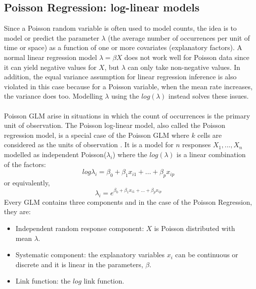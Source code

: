 \subsection{Poisson Regression: log-linear models}
Since a Poisson random variable is often used to model counts, the idea is to model or predict the parameter $\lambda$ (the average number of occurrences per unit of time or space) as a function of one or more covariates (explanatory factors). A normal linear regression model $\lambda = \beta X$ does not work well for Poisson data since it can yield negative values for $X$, but $\lambda$ can only take non-negative values. In addition, the equal variance assumption for linear regression inference is also violated in this case because for a Poisson variable, when the mean rate increases, the variance does too. Modelling $\lambda$ using the $log(\lambda)$ instead solves these issues.
\\
\\
Poisson \ac{GLM} arise in situations in which the count of occurrences is the primary unit of observation.
The Poisson log-linear model, also called the Poisson regression model, is a special case of the Poisson \ac{GLM} where $k$ cells are considered as the units of observation \cite{kendal}. It is a model for $n$ responses $X_1, ..., X_n$ modelled as independent Poisson($\lambda_i$) where the $log(\lambda)$ is a linear combination of the factors:
\begin{equation}
    log \lambda_i = \beta_0 + \beta_1 x_{i1} + ... + \beta_p x_{ip}
\end{equation}
or equivalently,
\begin{equation}
    \lambda_i = e^{\beta_0 + \beta_1 x_{i1} + ... + \beta_p x_{ip}}
\end{equation}
Every \ac{GLM} contains three components and in the case of the Poisson Regression, they are:
\begin{itemize}
    \item Independent random response component: $X$ is Poisson distributed with mean $\lambda$.
    \item Systematic component: the explanatory variables $x_i$ can be continuous or discrete and it is linear in the parameters, $\beta$. 
    \item Link function: the $log$ link function.
\end{itemize}

















